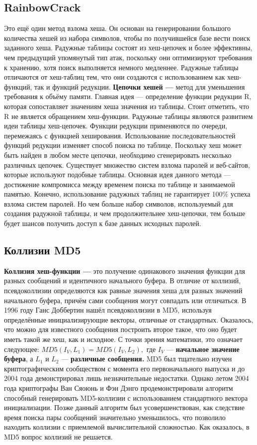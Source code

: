 \documentclass[a4paper,14pt]{report}
\begin{document}
\subsection{RainbowCrack}
Это ещё один метод взлома хеша. Он основан на генерировании большого количества хешей из набора символов, чтобы по получившейся базе вести поиск заданного хеша.
Радужные таблицы состоят из хеш-цепочек и более эффективны, чем предыдущий упомянутый тип атак, поскольку они оптимизируют требования к хранению, хотя поиск выполняется немного медленнее. Радужные таблицы отличаются от хеш-таблиц тем, что они создаются с использованием как хеш-функций, так и функций редукции.
\textbf{Цепочки хешей —} метод для уменьшения требования к объёму памяти. Главная идея — определение функции редукции R, которая сопоставляет значениям хеша значения из таблицы. Стоит отметить, что R не является обращением хеш-функции.
Радужные таблицы являются развитием идеи таблицы хеш-цепочек. Функции редукции применяются по очереди, перемежаясь с функцией хеширования.
Использование последовательностей функций редукции изменяет способ поиска по таблице. Поскольку хеш может быть найден в любом месте цепочки, необходимо сгенерировать несколько различных цепочек.
Существует множество систем взлома паролей и веб-сайтов, которые используют подобные таблицы. Основная идея данного метода — достижение компромисса между временем поиска по таблице и занимаемой памятью. Конечно, использование радужных таблиц не гарантирует 100\% успеха взлома систем паролей. Но чем больше набор символов, используемый для создания радужной таблицы, и чем продолжительнее хеш-цепочки, тем больше будет шансов получить доступ к базе данных исходных паролей.

\subsection{Коллизии MD5}
\textbf{Коллизия хеш-функции —} это получение одинакового значения функции для разных сообщений и идентичного начального буфера. В отличие от коллизий, псевдоколлизии определяются как равные значения хеша для разных значений начального буфера, причём сами сообщения могут совпадать или отличаться. В 1996 году Ганс Доббертин нашёл псевдоколлизии в MD5, используя определённые инициализирующие векторы, отличные от стандартных. Оказалось, что можно для известного сообщения построить второе такое, что оно будет иметь такой же хеш, как и исходное. С точки зрения математики, это означает следующее:
$MD5(I_V, L_1) = MD5(I_V, L_2),$
где $I_V$ — \textbf{начальное значение буфера}, а $L_1$ и $L_2$ — \textbf{различные сообщения.}
MD5 был тщательно изучен криптографическим сообществом с момента его первоначального выпуска и до 2004 года демонстрировал лишь незначительные недостатки. Однако летом 2004 года криптографы Ван Сяоюнь и Фэн Дэнго продемонстрировали алгоритм способный генерировать MD5-коллизии с использованием стандартного вектора инициализации.
Позже данный алгоритм был усовершенствован, как следствие время поиска пары сообщений значительно уменьшилось, что позволило находить коллизии с приемлемой вычислительной сложностью. Как оказалось, в MD5 вопрос коллизий не решается.
\end{document}
